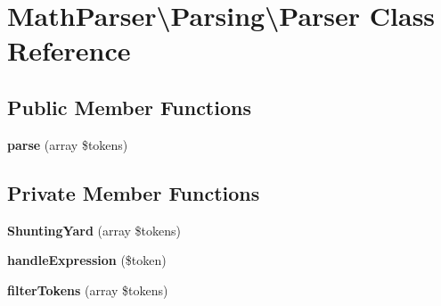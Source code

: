 \hypertarget{classMathParser_1_1Parsing_1_1Parser}{\section{Math\-Parser\textbackslash{}Parsing\textbackslash{}Parser Class Reference}
\label{classMathParser_1_1Parsing_1_1Parser}
}
\subsection*{Public Member Functions}
\begin{DoxyCompactItemize}
\item 
\hypertarget{classMathParser_1_1Parsing_1_1Parser_a556c64ee108e141b442badafbd3b1164}{{\bfseries parse} (array \$tokens)}\label{classMathParser_1_1Parsing_1_1Parser_a556c64ee108e141b442badafbd3b1164}

\end{DoxyCompactItemize}
\subsection*{Private Member Functions}
\begin{DoxyCompactItemize}
\item 
\hypertarget{classMathParser_1_1Parsing_1_1Parser_a5e95881d4b53730565bf2205fa621086}{{\bfseries Shunting\-Yard} (array \$tokens)}\label{classMathParser_1_1Parsing_1_1Parser_a5e95881d4b53730565bf2205fa621086}

\item 
\hypertarget{classMathParser_1_1Parsing_1_1Parser_a2572d3c71a4fd638bb0e9188c2e7f7e9}{{\bfseries handle\-Expression} (\$token)}\label{classMathParser_1_1Parsing_1_1Parser_a2572d3c71a4fd638bb0e9188c2e7f7e9}

\item 
\hypertarget{classMathParser_1_1Parsing_1_1Parser_a0896b00bcb6831560faea77f5ff7831c}{{\bfseries filter\-Tokens} (array \$tokens)}\label{classMathParser_1_1Parsing_1_1Parser_a0896b00bcb6831560faea77f5ff7831c}

\end{DoxyCompactItemize}
